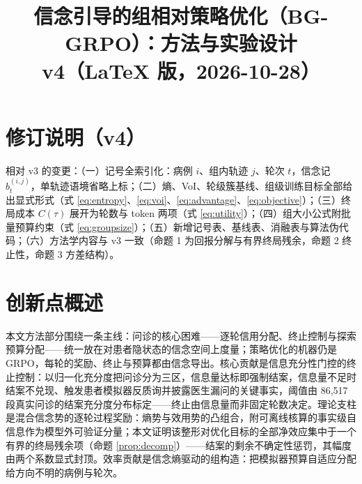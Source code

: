 \documentclass[11pt,a4paper]{ctexart}
\title{信念引导的组相对策略优化（BG-GRPO）：方法与实验设计\\ \large v4（LaTeX 版，2026-10-28）}
\author{}
\date{}
\newcommand{\1}[1]{\mathbb{1}\!\left[#1\right]}
\begin{document}
\maketitle

\section{修订说明（v4）}
相对 v3 的变更：（一）记号全索引化：病例 $i$、组内轨迹 $j$、轮次 $t$，信念记 $b_t^{(i,j)}$，单轨迹语境省略上标；（二）熵、VoI、轮级簇基线、组级训练目标全部给出显式形式（式 \eqref{eq:entropy}、\eqref{eq:voi}、\eqref{eq:advantage}、\eqref{eq:objective}）；（三）终局成本 $C(\tau)$ 展开为轮数与 token 两项（式 \eqref{eq:utility}）；（四）组大小公式附批量预算约束（式 \eqref{eq:groupsize}）；（五）新增记号表、基线表、消融表与算法伪代码；（六）方法学内容与 v3 一致（命题 1 为回报分解与有界终局残余，命题 2 终止性，命题 3 方差结构）。

\section{创新点概述}
本文方法部分围绕一条主线：问诊的核心困难——逐轮信用分配、终止控制与探索预算分配——统一放在对患者隐状态的信念空间上度量；策略优化的机器仍是 GRPO，每轮的奖励、终止与预算都由信念导出。核心贡献是信息充分性门控的终止控制：以归一化充分度把问诊分为三区，信息量达标即强制结案，信息量不足时结案不兑现、触发患者模拟器反质询并披露医生漏问的关键事实，阈值由 86{,}517 段真实问诊的结案充分度分布标定——终止由信息量而非固定轮数决定。理论支柱是混合信念势的逐轮过程奖励：熵势与效用势的凸组合，附可离线核算的事实级自信息作为模型外可验证分量；本文证明该整形对优化目标的全部净效应集中于一个有界的终局残余项（命题 \ref{prop:decomp}）——结案的剩余不确定性惩罚，其幅度由两个系数显式封顶。效率贡献是信念熵驱动的组构造：把模拟器预算自适应分配给方向不明的病例与轮次。
\end{document}
